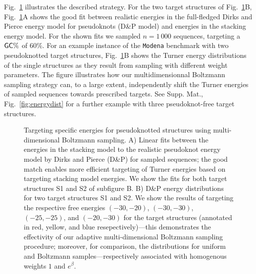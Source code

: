 \documentclass{bioinfo}
\makeatletter
\newlength{\@aligneps}
\newcommand{\includegraphicstop}[2][]{%
\sbox{\@alignepsbox}{\texttt{[image: \#2]}}%
\setlength{\@aligneps}{-\ht\@alignepsbox}%
\addtolength{\@aligneps}{2ex}%
\raisebox{\@aligneps}{\usebox{\@alignepsbox}}}
\makeatother
\begin{document}
Fig.~\ref{fig:energydist-pk} illustrates the described strategy. For
the two target structures of Fig.~\ref{fig:energydist-pk}B,
Fig.~\ref{fig:energydist-pk}A shows the good fit between realistic
energies in the full-fledged Dirks and Pierce energy model for
pseudoknots (D\&P model) and energies in the stacking energy
model. For the shown fits we sampled $n=1\,000$ sequences, targeting a
${\sf GC}\%$ of $60\%$.
%
For an example instance of the \texttt{Modena} benchmark with two
pseudoknotted target structures, Fig.~\ref{fig:energydist-pk}B shows
the Turner energy distributions of the single structures as they
result from sampling with different weight parameters. The figure
illustrates how our multidimensionnal Boltzmann sampling strategy can,
to a large extent, independently shift the Turner energies of sampled
sequences towards prescribed targets. See Supp. Mat.,
Fig.~\ref{fig:energydist} for a further example with three
pseudoknot-free target structures.

\begin{figure}[t]
  \begin{center}
    \includegraphicstop[width=0.99\textwidth]{Figs/energy_shift.pdf}\hfill
  \end{center}
  \caption{%
    Targeting specific energies for pseudoknotted structures using
    multi-dimensional Boltzmann sampling.  A) Linear fits between the
    energies in the stacking model to the realistic pseudoknot energy
    model by Dirks and Pierce (D\&P) for sampled sequences; the good
    match enables more efficient targeting of Turner energies based on
    targeting stacking model energies.  We show the fits for both
    target structures S1 and S2 of subfigure B.  B) D\&P energy
    distributions for two target structures S1 and S2. We show the
    results of targeting the respective free energies $(-30,-20)$,
    $(-30,-30)$, $(-25,-25)$, and $(-20,-30)$ for the target
    structures (annotated in red, yellow, and blue
    resepectively)---this demonstrates the effectivity of our adaptive
    multi-dimensional Boltzmann sampling procedure; moreover, for
    comparison, the distributions for uniform and Boltzmann
    samples---respectively associated with homogenous weights $1$ and
    $e^\beta$.
  }
  \label{fig:energydist-pk}
\end{figure}
\end{document}
